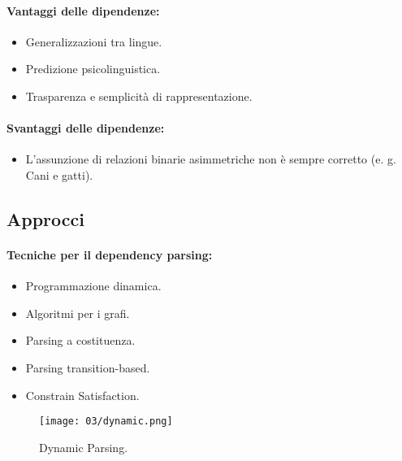 \paragraph{Vantaggi delle dipendenze:}

\begin{itemize}
  \item Generalizzazioni tra lingue. 
  \item Predizione psicolinguistica.
  \item Trasparenza e semplicità di rappresentazione.
\end{itemize}

\paragraph{Svantaggi delle dipendenze:}

\begin{itemize}
  \item L'assunzione di relazioni binarie asimmetriche non è sempre corretto (e. g. Cani e gatti).
\end{itemize}


\subsection{Approcci}

\paragraph{Tecniche per il dependency parsing:}

\begin{itemize}
  \item Programmazione dinamica. 
  \item Algoritmi per i grafi. 
  \item Parsing a costituenza. 
  \item Parsing transition-based. 
  \item Constrain Satisfaction.
\end{itemize}


\begin{figure}[!h]
    \centering
    \texttt{[image: 03/dynamic.png]}
    \caption{Dynamic Parsing.}
\end{figure}

